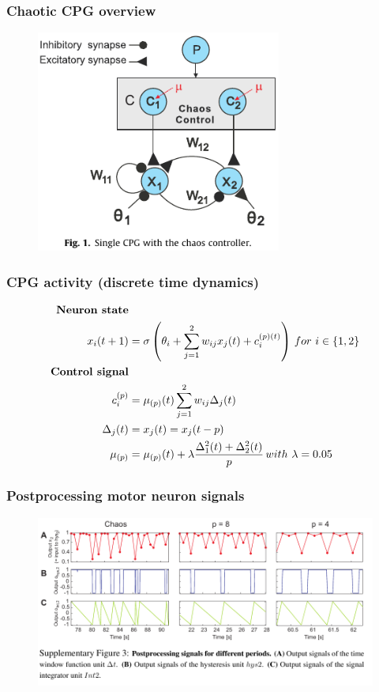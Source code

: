 \documentclass{beamer}
\begin{document}
\begin{frame}
\frametitle{Chaotic CPG overview}
\begin{figure}
\hspace*{-1cm}
\includegraphics[width=0.72\textwidth]{figs/CPG-overview.pdf}
\end{figure}
\end{frame}

\begin{frame}
\frametitle{CPG activity (discrete time dynamics)}
\begin{align*}
\text{\textbf{Neuron state}}&\\
x_i(t+1) &= \sigma\left(\theta_i + \sum\limits^2_{j=1}w_{ij} x_j(t) + c_i^{(p)(t)}\right) \, for~i \in \{1,2\}\\
\text{\textbf{Control signal}}&\\
c_i^{(p)} &= \mu_{(p)}(t)\sum\limits^{2}_{j=1}w_{ij}\Delta_j(t)\\
\Delta_j(t) &= x_j(t) = x_j(t-p)\\
\mu_{(p)} &= \mu_{(p)}(t) + \lambda\frac{\Delta^2_1(t) + \Delta^2_2(t)}{p} \, with~\lambda=0.05
\end{align*}
\end{frame}


\begin{frame}
\frametitle{Postprocessing motor neuron signals}
\begin{figure}
\center
\includegraphics[width=1\textwidth]{figs/Postprocessing-signals.pdf}
\end{figure}
\end{frame}
\end{document}
